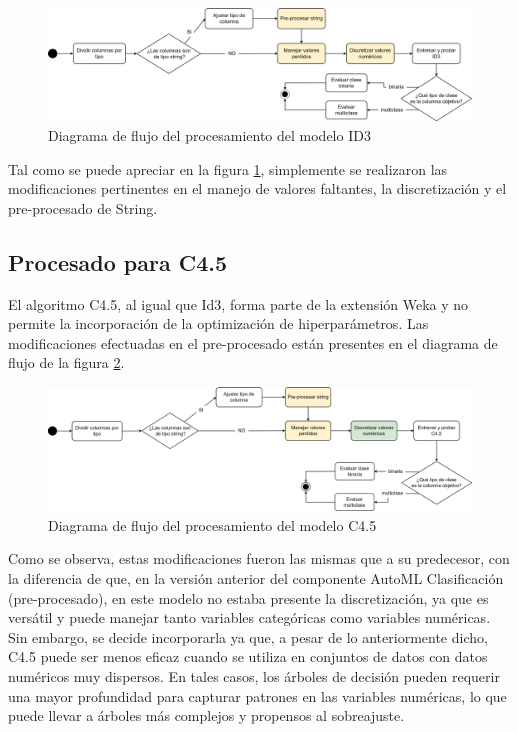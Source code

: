 \begin{figure}[H]
	\centering
	\includegraphics[width=1\linewidth]{"figuras/capi 2/modelos/procesado id3.drawio"}
	\caption{Diagrama de flujo del procesamiento del modelo ID3}
	\label{fig:procesado-id3}
\end{figure}

Tal como se puede apreciar en la figura \ref{fig:procesado-id3}, simplemente se realizaron las modificaciones pertinentes en el manejo de valores faltantes, la discretización y el pre-procesado de String.

\subsection{Procesado para C4.5}
El algoritmo C4.5, al igual que Id3, forma parte de la extensión Weka y no permite la incorporación de la optimización de hiperparámetros. Las modificaciones efectuadas en el pre-procesado están presentes en el diagrama de flujo de la figura \ref{fig:procesado-c4pt5}.

\begin{figure}[H]
	\centering
	\includegraphics[width=1\linewidth]{"figuras/capi 2/modelos/procesado c4pt5.drawio"}
	\caption{Diagrama de flujo del procesamiento del modelo C4.5}
	\label{fig:procesado-c4pt5}
\end{figure}

Como se observa, estas modificaciones fueron las mismas que a su predecesor, con la diferencia de que, en la versión anterior del componente AutoML Clasificación (pre-procesado), en este modelo no estaba presente la discretización, ya que es versátil y puede manejar tanto variables categóricas como variables numéricas. Sin embargo, se decide incorporarla ya que, a pesar de lo anteriormente dicho, C4.5 puede ser menos eficaz cuando se utiliza en conjuntos de datos con datos numéricos muy dispersos. En tales casos, los árboles de decisión pueden requerir una mayor profundidad para capturar patrones en las variables numéricas, lo que puede llevar a árboles más complejos y propensos al sobreajuste. 

